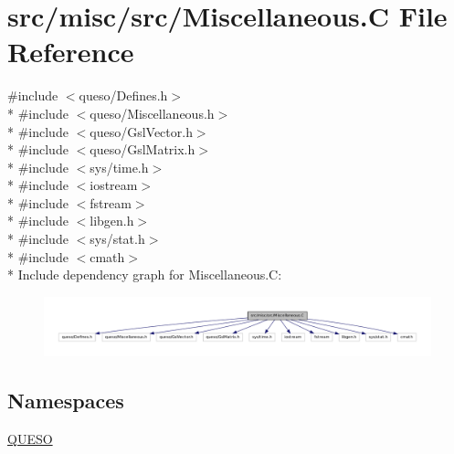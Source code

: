 \hypertarget{_miscellaneous_8_c}{\section{src/misc/src/\-Miscellaneous.C File Reference}
\label{_miscellaneous_8_c}
}
{\ttfamily \#include $<$queso/\-Defines.\-h$>$}\\*
{\ttfamily \#include $<$queso/\-Miscellaneous.\-h$>$}\\*
{\ttfamily \#include $<$queso/\-Gsl\-Vector.\-h$>$}\\*
{\ttfamily \#include $<$queso/\-Gsl\-Matrix.\-h$>$}\\*
{\ttfamily \#include $<$sys/time.\-h$>$}\\*
{\ttfamily \#include $<$iostream$>$}\\*
{\ttfamily \#include $<$fstream$>$}\\*
{\ttfamily \#include $<$libgen.\-h$>$}\\*
{\ttfamily \#include $<$sys/stat.\-h$>$}\\*
{\ttfamily \#include $<$cmath$>$}\\*
Include dependency graph for Miscellaneous.\-C\-:
\nopagebreak
\begin{figure}[H]
\begin{center}
\leavevmode
\includegraphics[width=350pt]{_miscellaneous_8_c__incl}
\end{center}
\end{figure}
\subsection*{Namespaces}
\begin{DoxyCompactItemize}
\item 
\hyperlink{namespace_q_u_e_s_o}{Q\-U\-E\-S\-O}
\end{DoxyCompactItemize}
